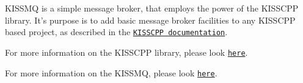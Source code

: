 K\-I\-S\-S\-M\-Q is a simple message broker, that employs the power of the K\-I\-S\-S\-C\-P\-P library. It's purpose is to add basic message broker facilities to any K\-I\-S\-S\-C\-P\-P based project, as described in the \href{http://thelastcylon.github.io/kisscpp/md_the_basic_problem.html}{\tt K\-I\-S\-S\-C\-P\-P documentation}.

For more information on the K\-I\-S\-S\-C\-P\-P library, please look \href{http://thelastcylon.github.io/kisscpp/index.html}{\tt here}.\par
 For more information on the K\-I\-S\-S\-M\-Q, please look \href{http://thelastcylon.github.io/kissmq/index.html}{\tt here}. 